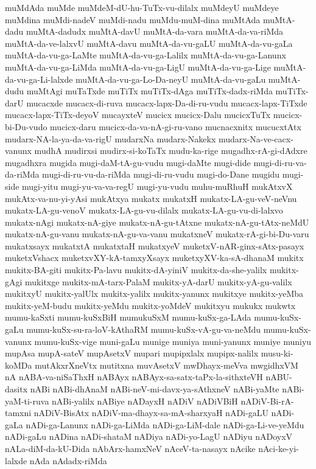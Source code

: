 {muMdAda
muMde
muMdeM-dU-hu-TuTx-vu-dilalx
muMdeyU
muMdeye
muMdina
muMdi-nadeV
muMdi-nadu
muMdu-muM-dina
muMtAda
muMtA-dadu
muMtA-dadudx
muMtA-davU
muMtA-da-vara
muMtA-da-va-riMda
muMtA-da-ve-lalxvU
muMtA-davu
muMtA-da-vu-gaLU
muMtA-da-vu-gaLa
muMtA-da-vu-ga-LaMte
muMtA-da-vu-ga-Lalilx
muMtA-da-vu-ga-Lanunx
muMtA-da-vu-ga-LiMda
muMtA-da-vu-ga-LigU
muMtA-da-vu-ga-Lige
muMtA-da-vu-ga-Li-lalxde
muMtA-da-vu-ga-Lo-Da-neyU
muMtA-da-vu-gaLu
muMtA-dudu
muMtAgi
muTaTxde
muTiTx
muTiTx-dAga
muTiTx-dadx-riMda
muTiTx-darU
mucacxde
mucacx-di-ruva
mucacx-lapx-Da-di-ru-vudu
mucacx-lapx-TiTxde
mucacx-lapx-TiTx-deyoV
mucayxteV
mucicx
mucicx-Dalu
mucicxTuTx
mucicx-bi-Du-vudo
mucicx-daru
mucicx-da-va-nA-gi-ru-vano
mucnacxnitx
mucucxtAtx
mudarx-NA-la-ya-da-va-rigU
mudarxNa
mudarx-Nakekx
mudarx-Na-ve-cacx-vanunx
mudhA
mudirxsi
mudirx-si-koTaTx
mudu-ka-rige
mugadhx-rA-gi-dAdxre
mugadhxra
mugida
mugi-daM-tA-gu-vudu
mugi-daMte
mugi-dide
mugi-di-ru-va-da-riMda
mugi-di-ru-vu-da-riMda
mugi-di-ru-vudu
mugi-do-Dane
mugidu
mugi-side
mugi-yitu
mugi-yu-va-va-regU
mugi-yu-vudu
muhu-muRhuH
mukAtxvX
mukAtx-va-nu-yi-yAsi
mukAtxya
mukatx
mukatxH
mukatx-LA-gu-veV-neVnu
mukatx-LA-gu-venoV
mukatx-LA-gu-vu-dilalx
mukatx-LA-gu-vu-di-lalxvo
mukatx-nAgi
mukatx-nA-giye
mukatx-nA-gu-tAtxne
mukatx-nA-gu-tAtx-neMdU
mukatx-nA-gu-vanu
mukatx-nA-gu-va-vanu
mukatxneV
mukatx-rA-gi-bi-Du-varu
mukatxsayx
mukatxtA
mukatxtaH
mukatxyeV
muketxV-nAR-ginx-sAtx-pasayx
muketxVshacx
muketxvXY-kA-tamxyXsayx
muketxyXV-ka-sA-dhanaM
mukitx
mukitx-BA-giti
mukitx-Pa-lavu
mukitx-dA-yiniV
mukitx-da-she-yalilx
mukitx-gAgi
mukitxge
mukitx-mA-tarx-PalaM
mukitx-yA-darU
mukitx-yA-gu-valilx
mukitxyU
mukitx-yalUlx
mukitx-yalilx
mukitx-yanunx
mukitxye
mukitx-yeMba
mukitx-yeM-budu
mukitx-yeMdu
mukitx-yoMdeV
mukitxyu
mukukx
mukwtx
mumu-kaSxti
mumu-kuSxBiH
mumukuSxM
mumu-kuSx-ga-LAda
mumu-kuSx-gaLu
mumu-kuSx-su-ra-loV-kAthaRM
mumu-kuSx-vA-gu-va-neMdu
mumu-kuSx-vanunx
mumu-kuSx-vige
muni-gaLu
munige
muniya
muni-yanunx
muniye
muniyu
mupAsa
mupA-sateV
mupAsetxV
mupari
mupipxlalx
mupipx-nalilx
musu-ki-koMDa
mutAkxrXneVtx
mutitxna
muvAsetxV
mwDhayx-meVva
mwgidhxVM
nA
nABA-va-niSaThxH
nABAyx
nABAyx-sa-satx-taPx-la-sithxteVH
nABU-dasitx
nABi
nABi-dhAnaM
nABi-neV-mi-davx-ya-sAthxneV
nABi-yaMte
nABi-yaM-ti-ruva
nABi-yalilx
nABiye
nADayxH
nADiV
nADiVBiH
nADiV-Bi-rA-tamxni
nADiV-BisAtx
nADiV-ma-dhayx-sa-mA-sharxyaH
nADi-gaLU
nADi-gaLa
nADi-ga-Lanunx
nADi-ga-LiMda
nADi-ga-LiM-dale
nADi-ga-Li-ve-yeMdu
nADi-gaLu
nADina
nADi-shataM
nADiya
nADi-yo-LagU
nADiyu
nADoyxV
nALa-diM-da-kU-Dida
nAbArx-hamxNeV
nAceV-ta-nasayx
nAcike
nAci-ke-yi-lalxde
nAda
nAdadx-riMda
}

